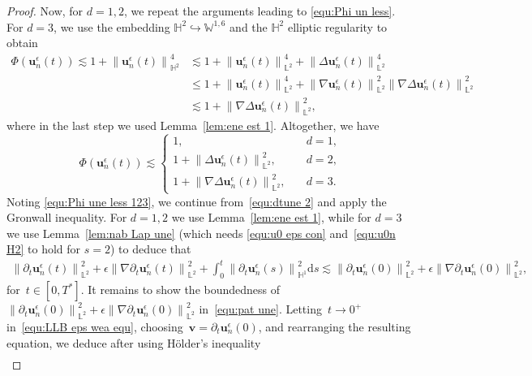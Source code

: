 \documentclass[11pt,reqno]{amsart}
\theoremstyle{definition}
\numberwithin{equation}{section}
\newcommand{\bff}{\boldsymbol}
\newcommand{\bb}{\mathbb}
\newcommand{\leqs}{\lesssim}
\newcommand{\ds}{\mathrm{d}s}
\newcommand{\pa}{\partial}
\newcommand{\norm}[2]{\left\|{#1}\right\|_{#2}}
\begin{document}
\begin{proof}
	Now, for $d=1,2$, we repeat the arguments leading to \eqref{equ:Phi un less}. For $d=3$, we use the embedding $\bb{H}^2\hookrightarrow \bb{W}^{1,6}$ and the $\bb{H}^2$ elliptic regularity to obtain
	\begin{align*}
		\Phi(\bff{u}_n^\epsilon(t)) 
		\leqs 1+ \norm{\bff{u}_n^\epsilon(t)}{\bb{H}^2}^4
		&\leqs
		1+ \norm{\bff{u}_n^\epsilon(t)}{\bb{L}^2}^4 + \norm{\Delta \bff{u}_n^\epsilon(t)}{\bb{L}^2}^4
		\\
		&\leq 
		1+ \norm{\bff{u}_n^\epsilon(t)}{\bb{L}^2}^4 + \norm{\nabla \bff{u}_n^\epsilon(t)}{\bb{L}^2}^2 \norm{\nabla\Delta \bff{u}_n^\epsilon(t)}{\bb{L}^2}^2
		\\
		&\leqs
		1+ \norm{\nabla\Delta \bff{u}_n^\epsilon(t)}{\bb{L}^2}^2,
	\end{align*}	
	where in the last step we used Lemma~\ref{lem:ene est 1}.
	Altogether, we have
	\begin{equation}\label{equ:Phi une less 123}
		\Phi(\bff{u}_n^\epsilon(t))
		\lesssim
		\begin{cases}
			1, \quad & d=1,
			\\
			1 + \norm{\Delta\bff{u}_n^\epsilon(t)}{\bb{L}^2}^2,
			\quad & d=2,
			\\
			1 + \norm{\nabla\Delta\bff{u}_n^\epsilon(t)}{\bb{L}^2}^2,
			\quad & d=3.
		\end{cases}
	\end{equation}
	Noting \eqref{equ:Phi une less 123}, we continue from~\eqref{equ:dtune 2} and apply the Gronwall inequality. For $d=1,2$ we use Lemma~\ref{lem:ene est 1}, while for $d=3$ we use Lemma~\ref{lem:nab Lap une} (which needs \eqref{equ:u0 eps con} and~\eqref{equ:u0n H2} to hold for $s=2$) to deduce that
	\begin{align}\label{equ:pat une}
		\norm{\pa_t\bff{u}^\epsilon_n(t)}{\bb{L}^2}^2
		+ \epsilon \norm{\nabla\pa_t\bff{u}^\epsilon_n(t)}{\bb{L}^2}^2
		+ \int_0^t \norm{\pa_t\bff{u}^\epsilon_n(s)}{\bb{H}^1}^2\ds
		\lesssim
		\norm{\pa_t\bff{u}^\epsilon_n(0)}{\bb{L}^2}^2
		+
		\epsilon \norm{\nabla\pa_t\bff{u}^\epsilon_n(0)}{\bb{L}^2}^2,
	\end{align}
	for~$t\in[0,T^\ast]$.
	It remains to show the boundedness of~$\norm{\pa_t\bff{u}^\epsilon_n(0)}{\bb{L}^2}^2
	+ \epsilon \norm{\nabla\pa_t\bff{u}^\epsilon_n(0)}{\bb{L}^2}^2$ in~\eqref{equ:pat une}.
	Letting~$t\to0^+$ in~\eqref{equ:LLB eps wea equ},
	choosing~$\bff{v}=\pa_t\bff{u}_n^\epsilon(0)$, and rearranging the resulting equation, we
	deduce after using H\" older's inequality
	\begin{align}\label{equ:dt une 0}

\end{align}
\end{proof}
\end{document}
